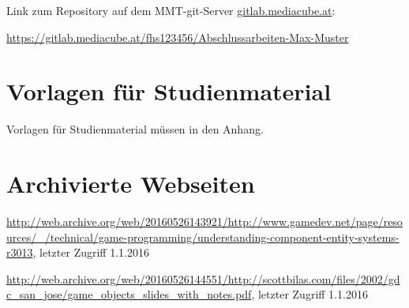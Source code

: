 \begin{appendices}
Link zum Repository auf dem MMT-git-Server {\url{gitlab.mediacube.at}}:

{\color{red}\url{https://gitlab.mediacube.at/fhs123456/Abschlussarbeiten-Max-Muster}}
	
\section{Vorlagen für Studienmaterial}

Vorlagen für Studienmaterial müssen in den Anhang. 

\section{Archivierte Webseiten}
\sloppy
\url{http://web.archive.org/web/20160526143921/http://www.gamedev.net/page/resources/_/technical/game-programming/understanding-component-entity-systems-r3013}, letzter Zugriff 1.1.2016

\url{http://web.archive.org/web/20160526144551/http://scottbilas.com/files/2002/gdc_san_jose/game_objects_slides_with_notes.pdf}, letzter Zugriff 1.1.2016

\end{appendices}

